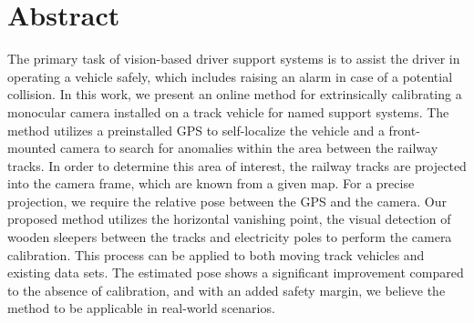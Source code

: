 \chapter*{Abstract}

The primary task of vision-based driver support systems is to assist the driver in operating a vehicle safely, which includes raising an alarm in case of a potential collision. In this work, we present an online method for extrinsically calibrating a monocular camera installed on a track vehicle for named support systems. The method utilizes a preinstalled GPS to self-localize the vehicle and a front-mounted camera to search for anomalies within the area between the railway tracks. In order to determine this area of interest, the railway tracks are projected into the camera frame, which are known from a given map. For a precise projection, we require the relative pose between the GPS and the camera. Our proposed method utilizes the horizontal vanishing point, the visual detection of wooden sleepers between the tracks and electricity poles to perform the camera calibration. This process can be applied to both moving track vehicles and existing data sets. The estimated pose shows a significant improvement compared to the absence of calibration, and with an added safety margin, we believe the method to be applicable in real-world scenarios.